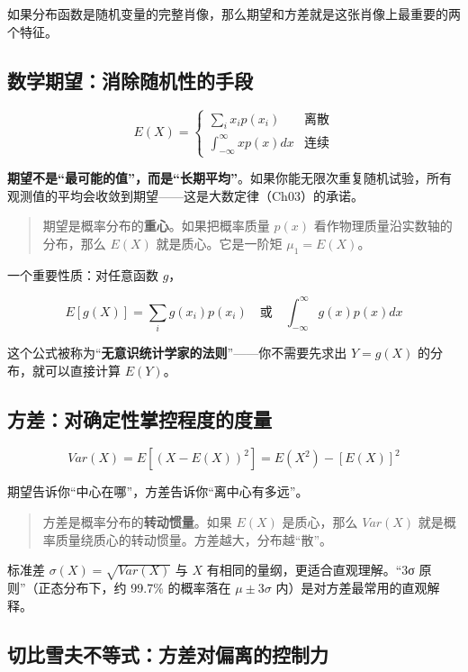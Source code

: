 \documentclass[
]{book}
\begin{document}
如果分布函数是随机变量的完整肖像，那么期望和方差就是这张肖像上最重要的两个特征。

\subsection{数学期望：消除随机性的手段}\label{ux6570ux5b66ux671fux671bux6d88ux9664ux968fux673aux6027ux7684ux624bux6bb5}

\[E(X) = \begin{cases} \sum_i x_i p(x_i) & \text{离散} \\ \int_{-\infty}^{\infty} x p(x) dx & \text{连续} \end{cases}\]

\textbf{期望不是``最可能的值''，而是``长期平均''}。如果你能无限次重复随机试验，所有观测值的平均会收敛到期望------这是大数定律（Ch03）的承诺。

\begin{quote}
期望是概率分布的\textbf{重心}。如果把概率质量 \(p(x)\) 看作物理质量沿实数轴的分布，那么 \(E(X)\) 就是质心。它是一阶矩 \(\mu_1 = E(X)\)。
\end{quote}

一个重要性质：对任意函数 \(g\)，

\[E[g(X)] = \sum_i g(x_i) p(x_i) \quad \text{或} \quad \int_{-\infty}^{\infty} g(x) p(x) dx\]

这个公式被称为``\textbf{无意识统计学家的法则}''------你不需要先求出 \(Y = g(X)\) 的分布，就可以直接计算 \(E(Y)\)。

\subsection{方差：对确定性掌控程度的度量}\label{ux65b9ux5deeux5bf9ux786eux5b9aux6027ux638cux63a7ux7a0bux5ea6ux7684ux5ea6ux91cf}

\[Var(X) = E[(X - E(X))^2] = E(X^2) - [E(X)]^2\]

期望告诉你``中心在哪''，方差告诉你``离中心有多远''。

\begin{quote}
方差是概率分布的\textbf{转动惯量}。如果 \(E(X)\) 是质心，那么 \(Var(X)\) 就是概率质量绕质心的转动惯量。方差越大，分布越``散''。
\end{quote}

标准差 \(\sigma(X) = \sqrt{Var(X)}\) 与 \(X\) 有相同的量纲，更适合直观理解。``3σ 原则''（正态分布下，约 99.7\% 的概率落在 \(\mu \pm 3\sigma\) 内）是对方差最常用的直观解释。

\subsection{切比雪夫不等式：方差对偏离的控制力}\label{ux5207ux6bd4ux96eaux592bux4e0dux7b49ux5f0fux65b9ux5deeux5bf9ux504fux79bbux7684ux63a7ux5236ux529b}
\end{document}
